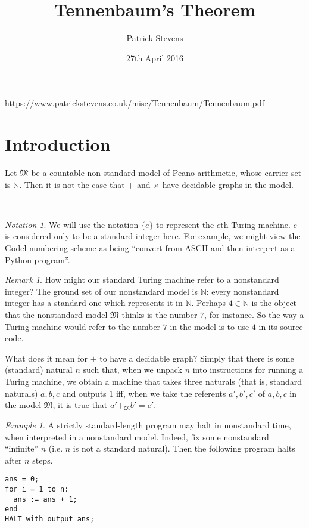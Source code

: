 \documentclass[11pt]{amsart}
\title{Tennenbaum's Theorem}
\author{Patrick Stevens}
\date{27th April 2016}
\theoremstyle{remark}
\newtheorem*{note}{Notation}
\newtheorem*{rmk}{Remark}
\newtheorem*{example}{Example}
\begin{document}
\maketitle 
\tiny \begin{center} \url{https://www.patrickstevens.co.uk/misc/Tennenbaum/Tennenbaum.pdf} \end{center}
\normalsize

\section{Introduction}

\begin{thm}
Let $\mathfrak{M}$ be a countable non-standard model of Peano arithmetic, whose carrier set is $\mathbb{N}$.
Then it is not the case that $+$ and $\times$ have decidable graphs in the model.
\end{thm}

\

\begin{note}
We will use the notation $\{ e\}$ to represent the $e$th Turing machine.
$e$ is considered only to be a standard integer here.
For example, we might view the G\"odel numbering scheme as being ``convert from ASCII and then interpret as a Python program''.
\end{note}

\begin{rmk}
How might our standard Turing machine refer to a nonstandard integer?
The ground set of our nonstandard model is $\mathbb{N}$: every nonstandard integer has a standard one which represents it in $\mathbb{N}$.
Perhaps $4 \in \mathbb{N}$ is the object that the nonstandard model $\mathfrak{M}$ thinks is the number $7$, for instance.
So the way a Turing machine would refer to the number $7$-in-the-model is to use $4$ in its source code.
\end{rmk}

What does it mean for $+$ to have a decidable graph?
Simply that there is some (standard) natural $n$ such that,
when we unpack $n$ into instructions for running a Turing machine,
we obtain a machine that takes three naturals (that is, standard naturals) $a, b, c$ and outputs $1$ iff, when we take the referents $a', b', c'$ of $a, b, c$ in the model $\mathfrak{M}$, it is true that $a' +_{\mathfrak{M}} b' = c'$.

\begin{example}
A strictly standard-length program may halt in nonstandard time, when interpreted in a nonstandard model.
Indeed, fix some nonstandard ``infinite'' $n$ (i.e. $n$ is not a standard natural).
Then the following program halts after $n$ steps.
\begin{verbatim} 
ans = 0;
for i = 1 to n:
  ans := ans + 1;
end
HALT with output ans;
\end{verbatim}
\end{example}
\end{document}
